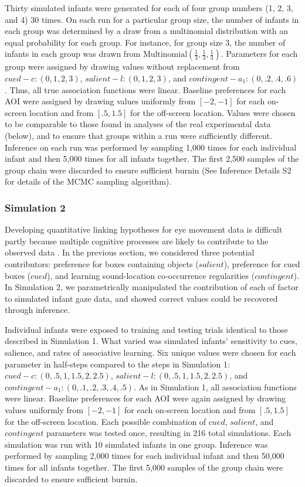 \documentclass[12pt]{article}
\begin{document}
	Thirty simulated infants were generated for each of four group numbers (1, 2, 3, and 4) 30 times. On each run for a particular group size, the number of infants in each group was determined by a draw from a multinomial distribution with an equal probability for each group. For instance, for group size 3, the number of infants in each group was drawn from $\text{Multinomial}(\frac{1}{3},\frac{1}{3},\frac{1}{3})$. Parameters for each group were assigned by drawing values without replacement from $cued - c: (0,1,2,3)$, $salient -  l: (0,1,2,3)$, and $contingent - a_{1}: (0,.2,.4,.6)$. Thus, all true association functions were linear. Baseline preferences for each AOI were assigned by drawing values uniformly from $[-2,-1]$ for each on-screen location and from $[.5,1.5]$  for the off-screen location. Values were chosen to be comparable to those found in analyses of the real experimental data (below), and to ensure that groups within a run were sufficiently different. Inference on each run was performed by sampling 1,000 times for each individual infant and then 5,000 times for all infants together. The first 2,500 samples of the group chain were discarded to ensure sufficient burnin (See Inference Details S2 for details of the MCMC sampling algorithm).

\subsubsection*{Simulation 2} 

	Developing quantitative linking hypotheses for eye movement data is difficult partly because multiple cognitive processes are likely to contribute to the observed data \cite{Aslin2007, Sirois2004, Hayhoe2005}. In the previous section, we considered three potential contributors: preference for boxes containing objects ($salient$), preference for cued boxes ($cued$), and learning sound-location co-occurrence regularities ($contingent$). In Simulation 2, we parametrically manipulated the contribution of each of factor to simulated infant gaze data, and showed correct values could be recovered through inference.

	Individual infants were exposed to training and testing trials identical to those described in Simulation 1. What varied was simulated infants' sensitivity to cues, salience, and rates of associative learning. Six unique values were chosen for each parameter in half-steps compared to the steps in Simulation 1: $cued - c: (0,.5,1,1.5,2,2.5)$, $salient - l: (0,.5,1,1.5,2,2.5)$, and $contingent - a_{1}: (0,.1,.2,.3,.4,.5)$. As in Simulation 1, all association functions were linear. Baseline preferences for each AOI were again assigned by drawing values uniformly from $[-2,-1]$ for each on-screen location and from $[.5,1.5]$ for the off-screen location. Each possible combination of $cued$, $salient$, and $contingent$ parameters was tested once, resulting in 216 total simulations. Each simulation was run with 10 simulated infants in one group. Inference was performed by sampling 2,000 times for each individual infant and then 50,000 times for all infants together. The first 5,000 samples of the group chain were discarded to ensure sufficient burnin.
\end{document}
